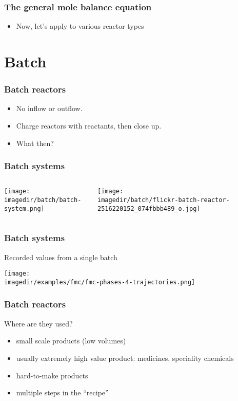 \begin{frame}\frametitle{The general mole balance equation}
	\begin{itemize}
		\item	Now, let's apply to various reactor types 
	\end{itemize}
\end{frame}

\section{Batch}
\begin{frame}\frametitle{Batch reactors}
	\begin{itemize}
		\item	No inflow or outflow.
		\item	Charge reactors with reactants, then close up.
		\item	What then?
	\end{itemize}
\end{frame}

\begin{frame}\frametitle{Batch systems}
	\begin{columns}[t]
			\begin{center}
				\texttt{[image: \\imagedir/batch/batch-system.png]}
			\end{center}
			
			\begin{center}
				\texttt{[image: \\imagedir/batch/flickr-batch-reactor-2516220152\_074fbbb489\_o.jpg]}
			\end{center}
	\end{columns}
\end{frame}

\begin{frame}\frametitle{Batch systems}
	Recorded values from a single batch
	\begin{center}
		\texttt{[image: \\imagedir/examples/fmc/fmc-phases-4-trajectories.png]}
	\end{center}
	\vspace{-18pt}
\end{frame}

\begin{frame}\frametitle{Batch reactors}
	Where are they used?
	\begin{itemize}
		\item	small scale products (low volumes)
		\item	usually extremely high value product: medicines, speciality chemicals
		\item	hard-to-make products
		\item	multiple steps in the ``recipe''
	\end{itemize}
\end{frame}

